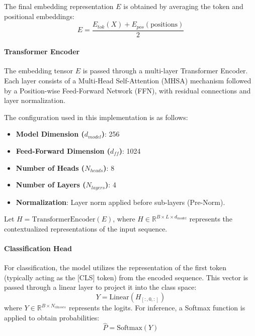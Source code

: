 \documentclass[10pt,a4paper,twocolumn]{article}
\begin{document}
The final embedding representation $E$ is obtained by averaging the token and positional embeddings:
\begin{equation}
    E = \frac{E_{tok}(X) + E_{pos}(\text{positions})}{2}
\end{equation}

\paragraph{Transformer Encoder}
The embedding tensor $E$ is passed through a multi-layer Transformer Encoder. Each layer consists of a Multi-Head Self-Attention (MHSA) mechanism followed by a Position-wise Feed-Forward Network (FFN), with residual connections and layer normalization. 

The configuration used in this implementation is as follows:
\begin{itemize}
    \item \textbf{Model Dimension ($d_{model}$)}: 256
    \item \textbf{Feed-Forward Dimension ($d_{ff}$)}: 1024
    \item \textbf{Number of Heads ($N_{heads}$)}: 8
    \item \textbf{Number of Layers ($N_{layers}$)}: 4
    \item \textbf{Normalization}: Layer norm applied before sub-layers (Pre-Norm).
\end{itemize}

Let $H = \text{TransformerEncoder}(E)$, where $H \in \mathbb{R}^{B \times L \times d_{model}}$ represents the contextualized representations of the input sequence.

\paragraph{Classification Head}
For classification, the model utilizes the representation of the first token (typically acting as the [CLS] token) from the encoded sequence. This vector is passed through a linear layer to project it into the class space:
\begin{equation}
    Y = \text{Linear}(H_{[:, 0, :]})
\end{equation}
where $Y \in \mathbb{R}^{B \times N_{classes}}$ represents the logits. For inference, a Softmax function is applied to obtain probabilities:
\begin{equation}
    \hat{P} = \text{Softmax}(Y)
\end{equation}
\end{document}
